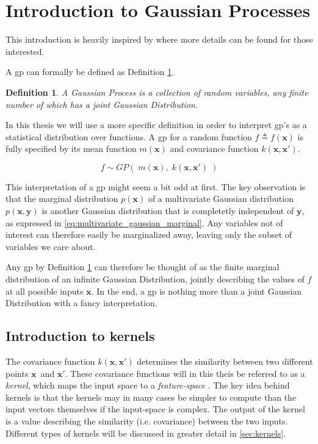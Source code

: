 \section{Introduction to Gaussian Processes}

This introduction is heavily inspired by \cite{rasmussen} where more details can be found for those interested. 

A \acrfull{gp} can formally be defined as Definition \ref{def:gp}.

\newtheorem{gp_def}{Definition}
\begin{gp_def}\label{def:gp}
A Gaussian Process is a collection of random variables, any finite number of which has a joint Gaussian Distribution.
\end{gp_def}

In this thesis we will use a more specific definition in order to interpret \acrshort{gp}'s as a statistical distribution over functions. A \acrshort{gp} for a random function $f \triangleq f(\boldsymbol{x})$ is fully specified by its mean function $m(\boldsymbol{x})$ and covariance function $k(\boldsymbol{x}, \boldsymbol{x}')$.

\begin{equation}\label{eq:gp}
    f \sim GP(\;m(\boldsymbol{x}), \; k(\boldsymbol{x}, \boldsymbol{x}')\;)
\end{equation}

This interpretation of a \acrshort{gp} might seem a bit odd at first. The key observation is that the marginal distribution $p(\boldsymbol{x})$ of a multivariate Gaussian distribution $p(\boldsymbol{x}, \boldsymbol{y})$ is another Gaussian distribution that is completetly independent of $\boldsymbol{y}$, as expressed in \cref{eq:multivariate_gaussian_marginal}. Any variables not of interest can therefore easily be marginalized away, leaving only the subset of variables we care about.

Any \acrshort{gp} by Definition \ref{def:gp} can therefore be thought of as the finite marginal distribution of an infinite Gaussian Distribution, jointly describing the values of $f$ at all possible inputs $\boldsymbol{x}$. In the end, a \acrshort{gp} is nothing more than a joint Gaussian Distribution with a fancy interpretation.

\subsection{Introduction to kernels}
The covariance function $k(\boldsymbol{x}, \boldsymbol{x}')$ determines the similarity between two different points $\boldsymbol{x}$ and $\boldsymbol{x}'$. These covariance functions will in this theis be referred to as a \textit{kernel}, which maps the input space to a \textit{feature-space} \cite{rasmussen}. The key idea behind kernels is that the kernels may in many cases be simpler to compute than the input vectors themselves if the input-space is complex. The output of the kernel is a value describing the similarity (i.e. covariance) between the two inputs. Different types of kernels will be discussed in greater detail in \cref{sec:kernels}.

